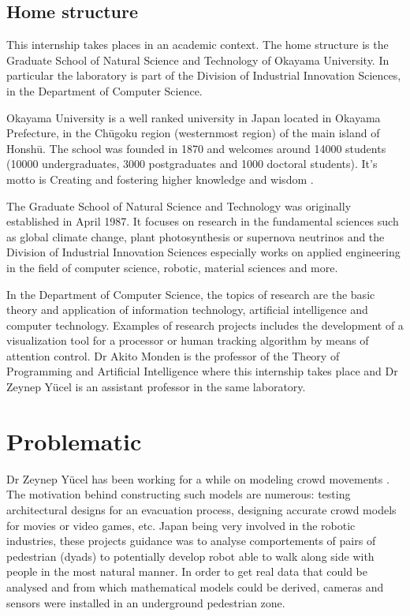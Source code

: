 \documentclass[12pt,a4paper,twoside]{article}
\begin{document}
\subsection{Home structure}
This internship takes places in an academic context. The home structure is the Graduate School of Natural Science and Technology of Okayama University. In particular the laboratory is part of the Division of Industrial Innovation Sciences, in the Department of Computer Science.

Okayama University is a well ranked university in Japan located in Okayama Prefecture, in the Chūgoku region (westernmost region) of the main island of Honshū. The school was founded in 1870  and welcomes around 14000 students (10000 undergraduates, 3000 postgraduates and 1000 doctoral students). It's motto is \guillemotleft Creating and fostering higher knowledge and wisdom \guillemotright.

The Graduate School of Natural Science and Technology was originally established in April 1987. It focuses on research in the fundamental sciences such as global climate change, plant photosynthesis or supernova neutrinos and the Division of Industrial Innovation Sciences especially works on applied engineering in the field of computer science, robotic, material sciences and more. 

In the Department of Computer Science, the topics of research are the basic theory and application of information technology, artificial intelligence and computer technology. Examples of research projects includes the development of a visualization tool for a processor or human tracking  algorithm by means of attention control. Dr Akito Monden is the professor of the Theory of Programming and Artificial Intelligence where this internship takes place and Dr Zeynep Yücel is an assistant professor in the same laboratory.

\section{Problematic}
Dr Zeynep Yücel has been working for a while on modeling crowd movements \cite{Zanlungo2017}\cite{Yucel2013}\cite{Yucel2017}. The motivation behind constructing such models are numerous: testing architectural designs for an evacuation process, designing accurate crowd models for movies or video games, etc. Japan being very involved in the robotic industries, these projects guidance was to analyse comportements of pairs of pedestrian (dyads) to potentially develop robot able to walk along side with people in the most natural manner. In order to get real data that could be analysed and from which mathematical models could be derived, cameras and sensors were installed in an underground pedestrian zone. 
\end{document}
